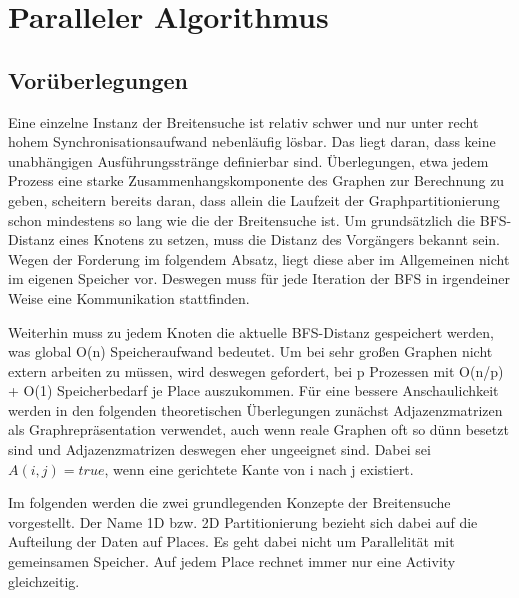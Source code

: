 \chapter{Paralleler Algorithmus} %
\label{cha:paralleler_algorithmus}

\section{Vorüberlegungen} %
\label{sec:vor_berlegungen}
Eine einzelne Instanz der Breitensuche ist relativ schwer und nur unter recht hohem Synchronisationsaufwand nebenläufig lösbar. Das liegt daran, dass keine unabhängigen Ausführungsstränge definierbar sind. Überlegungen, etwa jedem Prozess eine starke Zusammenhangskomponente des Graphen zur Berechnung zu geben, scheitern bereits daran, dass allein die Laufzeit der Graphpartitionierung schon mindestens so lang wie die der Breitensuche ist. Um grundsätzlich die BFS-Distanz eines Knotens zu setzen, muss die Distanz des Vorgängers bekannt sein. Wegen der Forderung im folgendem Absatz, liegt diese aber im Allgemeinen nicht im eigenen Speicher vor. Deswegen muss für jede Iteration der BFS in irgendeiner Weise eine Kommunikation stattfinden.

Weiterhin muss zu jedem Knoten die aktuelle BFS-Distanz gespeichert werden, was global O(n) Speicheraufwand bedeutet. Um bei sehr großen Graphen nicht extern arbeiten zu müssen, wird deswegen gefordert, bei p Prozessen mit O(n/p) + O(1) Speicherbedarf je Place auszukommen. Für eine bessere Anschaulichkeit werden in den folgenden theoretischen Überlegungen zunächst Adjazenzmatrizen als Graphrepräsentation verwendet, auch wenn reale Graphen oft so dünn besetzt sind und Adjazenzmatrizen deswegen eher ungeeignet sind. Dabei sei $A(i,j) = true$, wenn eine gerichtete Kante von i nach j existiert.

Im folgenden werden die zwei grundlegenden Konzepte der Breitensuche \cite{Buluc:2011} vorgestellt. Der Name 1D bzw. 2D Partitionierung bezieht sich dabei auf die Aufteilung der Daten auf Places. Es geht dabei nicht um Parallelität mit gemeinsamen Speicher. Auf jedem Place rechnet immer nur eine Activity gleichzeitig. 

